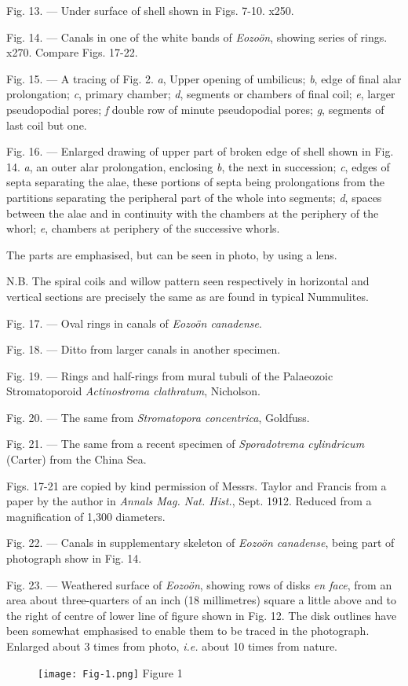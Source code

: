 \documentclass[a4paper, 12pt, oneside]{article}
\begin{document}
Fig. 13. --- Under surface of shell shown in Figs. 7-10. x250.

Fig. 14. --- Canals in one of the white bands of \emph{Eozoön}, showing series of rings. x270. Compare Figs. 17-22.

Fig. 15. --- A tracing of Fig. 2. \emph{a}, Upper opening of umbilicus; \emph{b}, edge of final alar prolongation; \emph{c}, primary chamber; \emph{d}, segments or chambers of final coil; \emph{e}, larger pseudopodial pores; \emph{f} double row of minute pseudopodial pores; \emph{g}, segments of last coil but one.

Fig. 16. --- Enlarged drawing of upper part of broken edge of shell shown in Fig. 14. \emph{a}, an outer alar prolongation, enclosing \emph{b}, the next in succession; \emph{c}, edges of septa separating the alae, these portions of septa being prolongations from the partitions separating the peripheral part of the whole into segments; \emph{d}, spaces between the alae and in continuity with the chambers at the periphery of the whorl; \emph{e}, chambers at periphery of the successive whorls.

The parts are emphasised, but can be seen in photo, by using a lens.

N.B. The spiral coils and willow pattern seen respectively in horizontal and vertical sections are precisely the same as are found in typical Nummulites.

Fig. 17. --- Oval rings in canals of \emph{Eozoön canadense}.

Fig. 18. --- Ditto from larger canals in another specimen.

Fig. 19. --- Rings and half-rings from mural tubuli of the Palaeozoic Stromatoporoid \emph{Actinostroma clathratum}, Nicholson.

Fig. 20. --- The same from \emph{Stromatopora concentrica}, Goldfuss.

Fig. 21. --- The same from a recent specimen of \emph{Sporadotrema cylindricum} (Carter) from the China Sea. 

Figs. 17-21 are copied by kind permission of Messrs. Taylor and Francis from a paper by the author in \emph{Annals Mag. Nat. Hist.}, Sept. 1912. Reduced from a magnification of 1,300 diameters.

Fig. 22. --- Canals in supplementary skeleton of \emph{Eozoön canadense}, being part of photograph show in Fig. 14.

Fig. 23. --- Weathered surface of \emph{Eozoön}, showing rows of disks \emph{en face}, from an area about three-quarters of an inch (18 millimetres) square a little above and to the right of centre of lower line of figure shown in Fig. 12. The disk outlines have been somewhat emphasised to enable them to be traced in the photograph. Enlarged about 3 times from photo, \emph{i.e.} about 10 times from nature.
\clearpage
\begin{figure}[b]
\centering
\texttt{[image: Fig-1.png]} Figure 1
\end{figure}
\clearpage
\end{document}
